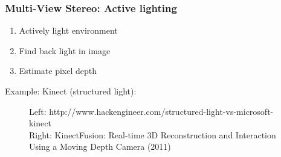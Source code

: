 \documentclass{beamer}
\begin{document}
\begin{frame}
  \frametitle{Multi-View Stereo: Active lighting} %
  \begin{enumerate}
    \item Actively light environment
    \item Find back light in image
    \item Estimate pixel depth
  \end{enumerate}
  Example: Kinect (structured light):
  \begin{figure}[htb!]
   \centering
   \caption*{\tiny Left: http://www.hackengineer.com/structured-light-vs-microsoft-kinect  \\ Right: KinectFusion: Real-time 3D Reconstruction and Interaction Using a Moving Depth Camera (2011)}
  \end{figure}
\end{frame}
\end{document}
